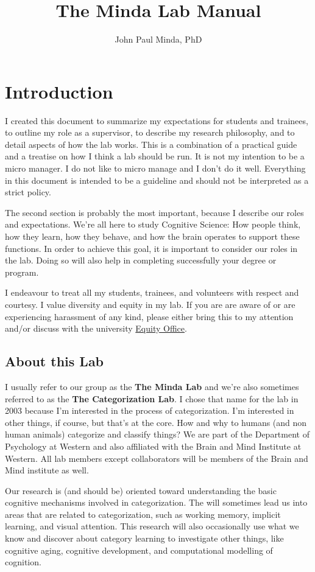\documentclass{article}
\title{The Minda Lab Manual}
\author{John Paul Minda, PhD}
\begin{document}
\maketitle
\tableofcontents

\section{Introduction} 
I created this document to summarize my expectations for students and trainees, to outline my role as a supervisor, to describe my research philosophy, and to detail aspects of how the lab works. This is a combination of a practical guide and a treatise on how I think a lab should be run. It is not my intention to be a micro manager. I do not like to micro manage and I don't do it well. Everything in this document is intended to be a guideline and should not be interpreted as a strict policy. 

The second section is probably the most important, because I describe our roles and expectations. We're all here to study Cognitive Science: How people think, how they learn, how they behave, and how the brain operates to support these functions. In order to achieve this goal, it is important to consider our roles in the lab. Doing so will also help in completing successfully your degree or program. 

I endeavour to treat all my students, trainees, and volunteers with respect and courtesy. I value diversity and equity in my lab. If you are are aware of or are experiencing harassment of any kind, please either bring this to my attention and/or discuss with the university \href{http://www.uwo.ca/equity/}{Equity Office}. 

\subsection{About this Lab}
I usually refer to our group as the \textbf{The Minda Lab} and we're also sometimes referred to as the \textbf{The Categorization Lab}. I chose that name for the lab in 2003 because I'm interested in the process of categorization. I'm interested in other things, if course, but that's at the core. How and why to humans (and non human animals) categorize and classify things? We are part of the Department of Psychology at Western and also affiliated with the Brain and Mind Institute at Western. All lab members except collaborators will be members of the Brain and Mind institute as well.

Our research is (and should be) oriented toward understanding the basic cognitive mechanisms involved in categorization. The will sometimes lead us into areas that are related to categorization, such as working memory, implicit learning, and visual attention. This research will also occasionally use what we know and discover about category learning to investigate other things, like cognitive aging, cognitive development, and computational modelling of cognition.
\end{document}
